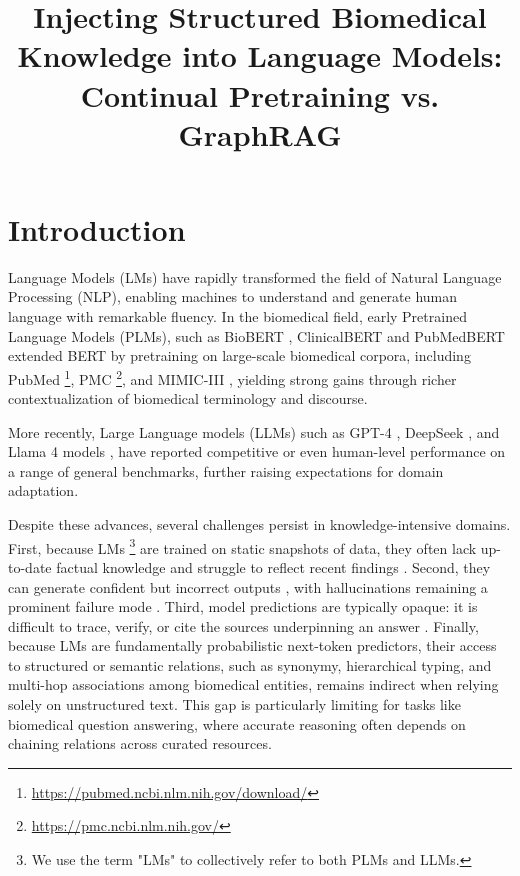\documentclass[10pt, a4paper]{article}
\title{Injecting Structured Biomedical Knowledge into Language Models: Continual Pretraining vs. GraphRAG}
\begin{document}
\pagestyle{empty}
\maketitleabstract

\section{Introduction}

Language Models (LMs) have rapidly transformed the field of Natural Language Processing (NLP), enabling machines to understand and generate human language with remarkable fluency. In the biomedical field, early Pretrained Language Models (PLMs), such as  BioBERT \cite{lee2020biobert}, ClinicalBERT \cite{alsentzer2019publicly} and PubMedBERT \cite{gu2021domain} extended BERT \cite{devlin2019bert} by pretraining on large-scale biomedical corpora, including PubMed \footnote{\url{https://pubmed.ncbi.nlm.nih.gov/download/}}, PMC \footnote{\url{https://pmc.ncbi.nlm.nih.gov/}}, and MIMIC-III \cite{johnson2016mimic}, yielding strong gains through richer contextualization of biomedical terminology and discourse.

More recently, Large Language models (LLMs) such as GPT-4 \cite{achiam2023gpt}, DeepSeek \cite{liu2024deepseek}, and Llama 4 models \cite{meta2025llama4card}, have reported competitive or even human-level performance on a range of general benchmarks, further raising expectations for domain adaptation.

Despite these advances, several challenges persist in knowledge-intensive domains. First, because LMs \footnote{We use the term "LMs" to collectively refer to both PLMs and LLMs.} are trained on static snapshots of data, they often lack up-to-date factual knowledge and struggle to reflect recent findings \cite{he2022rethinking,melnyk2021grapher}. Second, they can generate confident but incorrect outputs \cite{ji2023survey,bang2023multitask}, with hallucinations remaining a prominent failure mode \cite{huang2025survey}. Third, model predictions are typically opaque: it is difficult to trace, verify, or cite the sources underpinning an answer \cite{pan2024unifying}. Finally, because LMs are fundamentally probabilistic next-token predictors, their access to structured or semantic relations, such as synonymy, hierarchical typing, and multi-hop associations among biomedical entities, remains indirect when relying solely on unstructured text. This gap is particularly limiting for tasks like biomedical question answering, where accurate reasoning often depends on chaining relations across curated resources.
\end{document}
